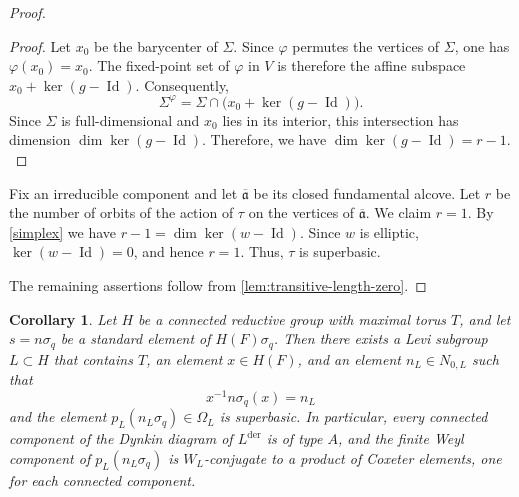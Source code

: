 \documentclass[11pt]{amsart}
\numberwithin{equation}{section}
\newtheorem{corollary}[corollary]{Corollary}
\theoremstyle{definition}
\theoremstyle{remark}
\begin{document}
\begin{proof}
\begin{proof}
Let $x_0$ be the barycenter of $\Sigma$. Since $\varphi$ permutes the vertices of $\Sigma$, one has $\varphi(x_0)=x_0$. The fixed-point set of $\varphi$ in $V$ is therefore the affine subspace $x_0+\ker(g-\operatorname{Id}).$ Consequently,
\[
  \Sigma^\varphi
  =
  \Sigma\cap\bigl(x_0+\ker(g-\operatorname{Id})\bigr).
\]
Since $\Sigma$ is full-dimensional and $x_0$ lies in its interior, this
intersection has dimension $\dim\ker(g-\operatorname{Id})$. Therefore, we have $ \dim\ker(g-\operatorname{Id})=r-1.$
\end{proof}
Fix an irreducible component and let $\overline{\mathfrak{a}}$ be its
closed fundamental alcove. Let $r$ be the number of orbits of the action of $\tau$ on the vertices of $\overline{\mathfrak{a}}$. We claim $r=1$. By \cref{simplex} we have $r-1=\dim\ker(w-\operatorname{Id}).$
Since $w$ is elliptic, $\ker(w-\operatorname{Id})=0$, and hence $r=1$. Thus, $\tau$ is superbasic.

The remaining assertions follow from \cref{lem:transitive-length-zero}.
\end{proof}
\begin{corollary}
\label{prop:superbasic-reduction}
Let $H$ be a connected reductive group with maximal torus $T$, and let
$s=n\sigma_q$ be a standard element of $H(F)\sigma_q$.  Then there
exists a Levi subgroup $L\subset H$ that contains $T$, an element
$x\in H(F)$, and an element $n_L\in N_{0,L}$ such that
\begin{equation}\label{eq:superbasic-conjugation}
  x^{-1}n\sigma_q(x)=n_L
\end{equation}
and the element $p_L(n_L\sigma_q)\in\Omega_L$ is superbasic. In particular, every connected component of the Dynkin diagram of
$L^{\mathrm{der}}$ is of type $A$, and the finite Weyl component of
$p_L(n_L\sigma_q)$ is $W_L$-conjugate to a product of Coxeter elements, one for each connected component.
\end{corollary}
\end{document}
